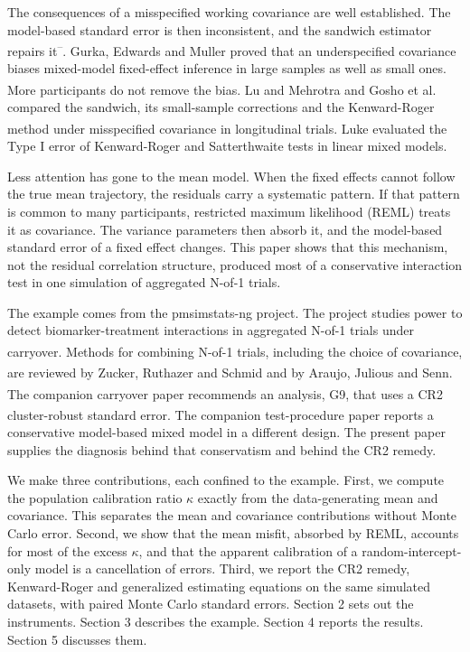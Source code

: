 \documentclass[
  11pt,
]{article}
\begin{document}
The consequences of a misspecified working covariance are well
established. The model-based standard error is then inconsistent, and
the sandwich estimator repairs it\textsuperscript{--}.
Gurka, Edwards and Muller\textsuperscript{} proved that an underspecified
covariance biases mixed-model fixed-effect inference in large samples
as well as small ones. More participants do not remove the bias. Lu
and Mehrotra\textsuperscript{} and Gosho et al.\textsuperscript{} compared the
sandwich, its small-sample corrections and the Kenward-Roger method
under misspecified covariance in longitudinal trials. Luke\textsuperscript{} evaluated the Type I error of Kenward-Roger and
Satterthwaite tests in linear mixed models.

Less attention has gone to the mean model. When the fixed effects
cannot follow the true mean trajectory, the residuals carry a
systematic pattern. If that pattern is common to many participants,
restricted maximum likelihood (REML) treats it as covariance. The
variance parameters then absorb it, and the model-based standard error
of a fixed effect changes. This paper shows that this mechanism, not
the residual correlation structure, produced most of a conservative
interaction test in one simulation of aggregated N-of-1 trials.

The example comes from the pmsimstats-ng project. The project studies
power to detect biomarker-treatment interactions in aggregated N-of-1
trials under carryover\textsuperscript{}. Methods for combining
N-of-1 trials, including the choice of covariance, are reviewed by
Zucker, Ruthazer and Schmid\textsuperscript{} and by Araujo, Julious and
Senn\textsuperscript{}. The companion carryover paper\textsuperscript{} recommends an analysis, G9, that uses a CR2
cluster-robust standard error. The companion test-procedure paper\textsuperscript{} reports a conservative model-based mixed model
in a different design. The present paper supplies the diagnosis behind
that conservatism and behind the CR2 remedy.

We make three contributions, each confined to the example. First, we
compute the population calibration ratio \(\kappa\) exactly from the
data-generating mean and covariance. This separates the mean and
covariance contributions without Monte Carlo error. Second, we show
that the mean misfit, absorbed by REML, accounts for most of the
excess \(\kappa\), and that the apparent calibration of a
random-intercept-only model is a cancellation of errors. Third, we
report the CR2 remedy, Kenward-Roger and generalized estimating
equations on the same simulated datasets, with paired Monte Carlo
standard errors. Section 2 sets out the instruments. Section 3
describes the example. Section 4 reports the results. Section 5
discusses them.
\end{document}
